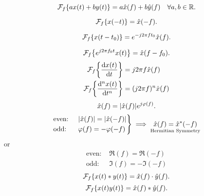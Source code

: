\documentclass{report}
\newcommand{\Ft}[1]{\SF_f\!\lt\{ #1 \rt\}}
\begin{document}
\begin{description}
	\ii[Linearity]
	\[
		\Ft{ax(t) + by(t)} = a\hat{x}(f) + b\hat{y}(f) \quad \forall a,b \in \RR
		.\]

	\ii[Inverse]
	\[
		\Ft{x(-t)} = \hat{x}(-f)
		.\]

	\[
		\Ft{x(t-t_0)} = e^{-j2\pi ft_0}\hat{x}(f)
		.\]

	\ii[Modulation]
	\[
		\Ft{e^{j2\pi f_0t}x(t)} = \hat{x}(f-f_0)
		.\]
	\ii[Differentiation]
	\begin{align*}
		\Ft{\dv{x(t)}{t}}    & = j2\pi f\hat{x}(f)     \\
		\Ft{\dv[n]{x(t)}{t}} & = (j2\pi f)^n\hat{x}(f)
	\end{align*}
	\ii[Symmetry]
	\[
		\hat{x}(f) = \abs{\hat{x}(f)} e^{j \varphi(f)}
		.\]
	\[
		\begin{rcases}
			\text{even: } & \abs{\hat{x}(f)} = \abs{\hat{x}(-f)} \\
			\text{odd: }  & \varphi(f) = -\varphi(-f)
		\end{rcases} \implies \underset{\text{Hermitian Symmetry}}{\hat{x}(f) = \hat{x}^*(-f)}
	\]
	or
	\begin{align*}
		\text{even: } & \Re(f) = \Re(-f)  \\
		\text{odd: }  & \Im(f) = -\Im(-f)
	\end{align*}
	\ii[Convolution]
	\[
		\Ft{x(t) * y(t)} = \hat{x}(f)\cdot\hat{y}(f)
		.\]
	\ii[Product]
	\[
		\Ft{x(t)y(t)} = \hat{x}(f) * \hat{y}(f)
		.\]
\end{description}

\end{document}
